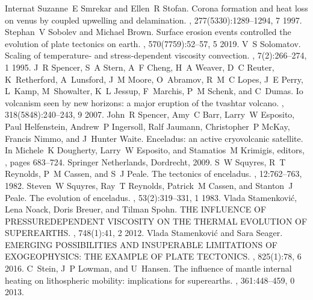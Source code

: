 \documentclass[letterpaper,10pt,english]{jupyterBook}
\begin{document}
\begin{sphinxthebibliography}{Internat}
\sphinxAtStartPar
Suzanne E Smrekar and Ellen R Stofan. Corona formation and heat loss on venus by coupled upwelling and delamination. , 277(5330):1289–1294, 7 1997.
\sphinxAtStartPar
Stephan V Sobolev and Michael Brown. Surface erosion events controlled the evolution of plate tectonics on earth. , 570(7759):52–57, 5 2019.
\sphinxAtStartPar
V S Solomatov. Scaling of temperature‐ and stress‐dependent viscosity convection. , 7(2):266–274, 1 1995.
\sphinxAtStartPar
J R Spencer, S A Stern, A F Cheng, H A Weaver, D C Reuter, K Retherford, A Lunsford, J M Moore, O Abramov, R M C Lopes, J E Perry, L Kamp, M Showalter, K L Jessup, F Marchis, P M Schenk, and C Dumas. Io volcanism seen by new horizons: a major eruption of the tvashtar volcano. , 318(5848):240–243, 9 2007.
\sphinxAtStartPar
John R Spencer, Amy C Barr, Larry W Esposito, Paul Helfenstein, Andrew P Ingersoll, Ralf Jaumann, Christopher P McKay, Francis Nimmo, and J Hunter Waite. Enceladus: an active cryovolcanic satellite. In Michele K Dougherty, Larry W Esposito, and Stamatios M Krimigis, editors, , pages 683–724. Springer Netherlands, Dordrecht, 2009.
\sphinxAtStartPar
S W Squyres, R T Reynolds, P M Cassen, and S J Peale. The tectonics of enceladus. , 12:762–763, 1982.
\sphinxAtStartPar
Steven W Squyres, Ray T Reynolds, Patrick M Cassen, and Stanton J Peale. The evolution of enceladus. , 53(2):319–331, 1 1983.
\sphinxAtStartPar
Vlada Stamenković, Lena Noack, Doris Breuer, and Tilman Spohn. THE INFLUENCE OF PRESSURE\sphinxhyphen{}DEPENDENT VISCOSITY ON THE THERMAL EVOLUTION OF SUPER\sphinxhyphen{}EARTHS. , 748(1):41, 2 2012.
\sphinxAtStartPar
Vlada Stamenković and Sara Seager. EMERGING POSSIBILITIES AND INSUPERABLE LIMITATIONS OF EXOGEOPHYSICS: THE EXAMPLE OF PLATE TECTONICS. , 825(1):78, 6 2016.
\sphinxAtStartPar
C Stein, J P Lowman, and U Hansen. The influence of mantle internal heating on lithospheric mobility: implications for super\sphinxhyphen{}earths. , 361:448–459, 0 2013.

\end{sphinxthebibliography}
\end{document}
